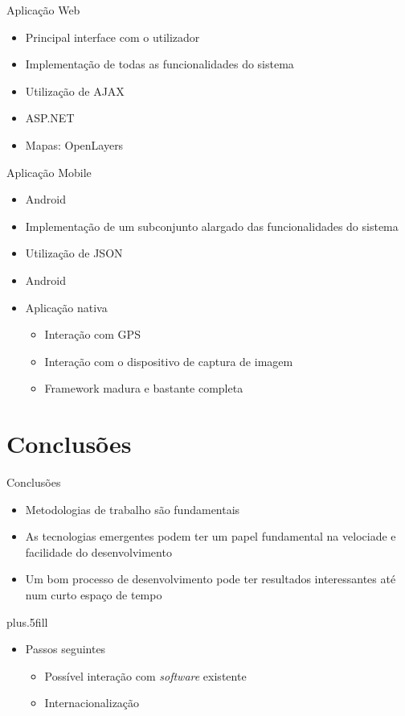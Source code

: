 \documentclass[portuges]{beamer}
\begin{document}
\begin{frame}{Aplicação Web}
 \begin{itemize}
 \item Principal interface com o utilizador
 \item Implementação de todas as funcionalidades do sistema
 \item Utilização de AJAX
 \item ASP.NET 
 \item Mapas: OpenLayers
 \end{itemize}
\end{frame}

\begin{frame}{Aplicação Mobile}
 \begin{itemize}
 \item Android
 \item Implementação de um subconjunto alargado das funcionalidades do sistema
 \item Utilização de JSON
 \item Android
 \item Aplicação nativa
 \begin{itemize}
  \item Interação com GPS
  \item Interação com o dispositivo de captura de imagem
  \item Framework madura e bastante completa
 \end{itemize}
 \end{itemize}
\end{frame}

\section*{Conclusões}

\begin{frame}{Conclusões}

  \begin{itemize}
  \item Metodologias de trabalho são fundamentais
  \item As tecnologias emergentes podem ter um papel fundamental na velociade e facilidade do desenvolvimento
  \item Um bom processo de desenvolvimento pode ter resultados interessantes até num curto espaço de tempo 
  \end{itemize}
  
  \vskip0pt plus.5fill
  \begin{itemize}
  \item
    Passos seguintes
    \begin{itemize}
    \item Possível interação com \emph{software} existente 
    \item Internacionalização
    \end{itemize}
  \end{itemize}
\end{frame}
\end{document}
